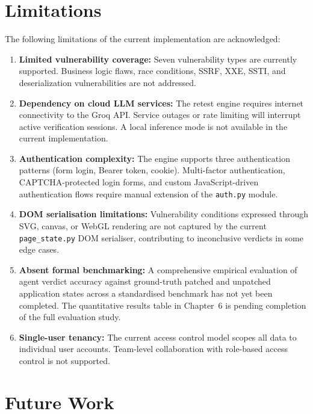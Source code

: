 \section{Limitations}

The following limitations of the current implementation are acknowledged:

\begin{enumerate}
    \item \textbf{Limited vulnerability coverage:} Seven vulnerability types are currently supported. Business logic flaws, race conditions, SSRF, XXE, SSTI, and deserialization vulnerabilities are not addressed.

    \item \textbf{Dependency on cloud LLM services:} The retest engine requires internet connectivity to the Groq API. Service outages or rate limiting will interrupt active verification sessions. A local inference mode is not available in the current implementation.

    \item \textbf{Authentication complexity:} The engine supports three authentication patterns (form login, Bearer token, cookie). Multi-factor authentication, CAPTCHA-protected login forms, and custom JavaScript-driven authentication flows require manual extension of the \texttt{auth.py} module.

    \item \textbf{DOM serialisation limitations:} Vulnerability conditions expressed through SVG, canvas, or WebGL rendering are not captured by the current \texttt{page\_state.py} DOM serialiser, contributing to inconclusive verdicts in some edge cases.

    \item \textbf{Absent formal benchmarking:} A comprehensive empirical evaluation of agent verdict accuracy against ground-truth patched and unpatched application states across a standardised benchmark has not yet been completed. The quantitative results table in Chapter~6 is pending completion of the full evaluation study.

    \item \textbf{Single-user tenancy:} The current access control model scopes all data to individual user accounts. Team-level collaboration with role-based access control is not supported.
\end{enumerate}

\section{Future Work}

